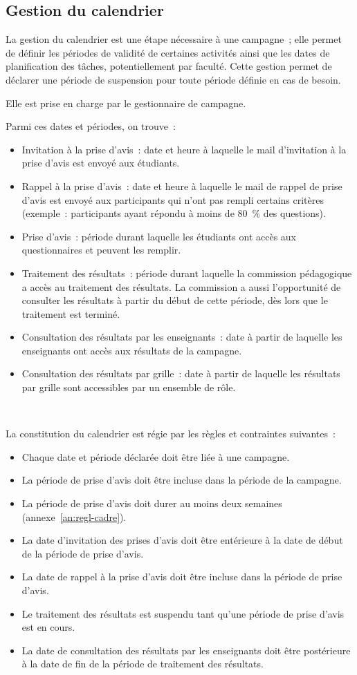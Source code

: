 \documentclass[a4paper,11pt]{report}
\begin{document}
\subsection{Gestion du calendrier}
La gestion du calendrier est une étape nécessaire à une campagne~; elle permet de définir les périodes de validité de certaines activités ainsi que les dates de planification des tâches, potentiellement par faculté.
Cette gestion permet de déclarer une période de suspension pour toute période définie en cas de besoin.

\noindent Elle est prise en charge par le gestionnaire de campagne.

\noindent Parmi ces dates et périodes, on trouve~:
\begin{itemize}
	\item Invitation à la prise d'avis~: date et heure à laquelle le mail d'invitation à la prise d'avis est envoyé aux étudiants.
	\item Rappel à la prise d'avis~: date et heure à laquelle le mail de rappel de prise d'avis est envoyé aux participants qui n'ont pas rempli certains critères (exemple~: participants ayant répondu à moins de 80~\% des questions).
	\item Prise d'avis~: période durant laquelle les étudiants ont accès aux questionnaires et peuvent les remplir.
	\item Traitement des résultats~: période durant laquelle la commission pédagogique a accès au traitement des résultats. La commission a aussi l'opportunité de consulter les résultats à partir du début de cette période, dès lors que le traitement est terminé.
	\item Consultation des résultats par les enseignants~: date à partir de laquelle les enseignants ont accès aux résultats de la campagne.
	\item Consultation des résultats par grille~: date à partir de laquelle les résultats par grille sont accessibles par un ensemble de rôle.
\end{itemize}
~\newline{}

La constitution du calendrier est régie par les règles et contraintes suivantes~:
\begin{itemize}
	\item Chaque date et période déclarée doit être liée à une campagne.
	\item La période de prise d'avis doit être incluse dans la période de la campagne.
	\item La période de prise d'avis doit durer au moins deux semaines (annexe~\ref{an:regl-cadre}).
	\item La date d'invitation des prises d'avis doit être entérieure à la date de début de la période de prise d'avis.
	\item La date de rappel à la prise d'avis doit être incluse dans la période de prise d'avis.
	\item Le traitement des résultats est suspendu tant qu'une période de prise d'avis est en cours.
	\item La date de consultation des résultats par les enseignants doit être postérieure à la date de fin de la période de traitement des résultats.
\end{itemize}
\end{document}
